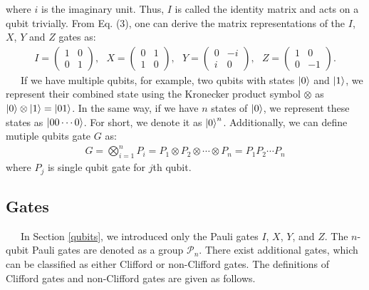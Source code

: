 \documentclass[a4paper,11pt]{ltjsarticle}
\begin{document}
{{        where $i$ is the imaginary unit. Thus, $I$ is called the identity matrix and acts on a qubit trivially. From Eq. (3), one can derive the matrix representations of the $I$, $X$, $Y$ and $Z$ gates as:
        \begin{align}
            I=\left(\begin{array}{cc}
                1&0\\
                0&1
            \end{array}\right),\ \ \ 
            X=\left(\begin{array}{cc}
                0&1\\
                1&0
            \end{array}\right),\ \ \ 
            Y=\left(\begin{array}{cc}
                0&-i\\
                i&0
            \end{array}\right),\ \ \ 
            Z=\left(\begin{array}{cc}
                1&0\\
                0&-1
            \end{array}\right).
        \end{align}
        \ \ \ If we have multiple qubits, for example, two qubits with states $\ket{0}$ and $\ket{1}$, we represent their combined state using the Kronecker product symbol $\otimes$ as $\ket{0} \otimes \ket{1} = \ket{01}$. In the same way, if we have $n$ states of $\ket{0}$, we represent these states as $\ket{00\cdots 0}$. For short, we denote it as $\ket{0}^n$. Additionally, we can define mutiple qubits gate $G$ as:
        \begin{align}
            G = \bigotimes^n_{i=1}{P_i}=P_1\otimes P_2\otimes\cdots \otimes P_n=P_1P_2\cdots P_n
        \end{align}
        where $P_j$ is single qubit gate for $j$th qubit.
    }
    \subsection{Gates}\label{gates}{
        \ \ \ In Section \ref{qubits}, we introduced only the Pauli gates $I$, $X$, $Y$, and $Z$. The $n$-qubit Pauli gates are denoted as a group $\mathcal{P}_n$. There exist additional gates, which can be classified as either Clifford or non-Clifford gates. The definitions of Clifford gates and non-Clifford gates are given as follows.

}}
\end{document}
